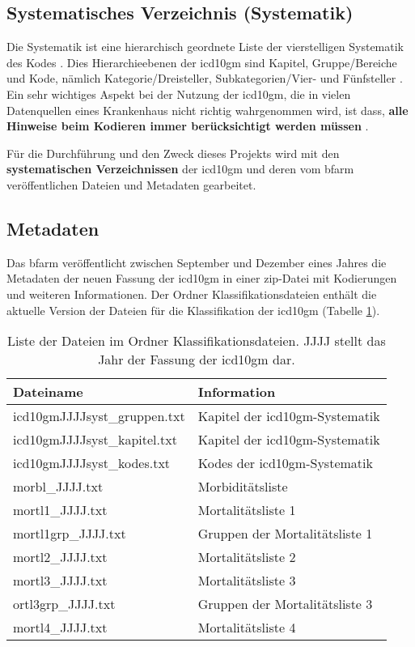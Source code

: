 \subsection{Systematisches Verzeichnis (Systematik)} 

Die Systematik ist eine hierarchisch geordnete Liste der vierstelligen Systematik des Kodes \cite{icd10syst, icd10systauf}. Dies Hierarchieebenen der \ac{icd10gm} sind Kapitel, Gruppe/Bereiche und Kode, nämlich Kategorie/Dreisteller, Subkategorien/Vier- und Fünfsteller \cite{icd10systauf}. Ein sehr wichtiges Aspekt bei der Nutzung der \ac{icd10gm}, die in vielen Datenquellen eines Krankenhaus nicht richtig wahrgenommen wird, ist dass, \textbf{alle Hinweise beim Kodieren immer berücksichtigt werden müssen} \cite{icd10systauf}.

Für die Durchführung und den Zweck dieses Projekts wird mit den \textbf{systematischen Verzeichnissen} der \ac{icd10gm} und deren vom \ac{bfarm} veröffentlichen Dateien und Metadaten gearbeitet. 

\subsection{Metadaten}

Das \ac{bfarm} veröffentlicht zwischen September und Dezember eines Jahres die Metadaten der neuen Fassung der \ac{icd10gm} in einer \ac{zip}-Datei mit Kodierungen und weiteren Informationen. Der Ordner Klassifikationsdateien enthält die aktuelle Version der Dateien für die Klassifikation der \ac{icd10gm} (Tabelle \ref{tab:classfiles}).

\begin{table}[ht]
	\centering
	\small
	\caption[Inhalt im Ordner Klassifikationsdateien ]{Liste der Dateien im Ordner Klassifikationsdateien. \glqq JJJJ\grqq{} stellt das Jahr der Fassung der \ac{icd10gm} dar.}
	\label{tab:classfiles}
	\begin{tabular}{|l|l|}
		\hline
		\rowcolor{lightgray} Dateiname & Information \\
		\hline 
		{\ttfamily icd10gmJJJJsyst\_gruppen.txt} &  Kapitel der \ac{icd10gm}-Systematik \\ \hline
		{\ttfamily icd10gmJJJJsyst\_kapitel.txt} & Kapitel der \ac{icd10gm}-Systematik \\ \hline
		{\ttfamily icd10gmJJJJsyst\_kodes.txt} & Kodes der \ac{icd10gm}-Systematik \\ \hline
		{\ttfamily morbl\_JJJJ.txt} & Morbiditätsliste  \\ \hline
		{\ttfamily mortl1\_JJJJ.txt} & Mortalitätsliste 1 \\ \hline
		{\ttfamily mortl1grp\_JJJJ.txt} & Gruppen der Mortalitätsliste 1 \\ \hline
		{\ttfamily mortl2\_JJJJ.txt} & Mortalitätsliste 2 \\ \hline
		{\ttfamily mortl3\_JJJJ.txt} & Mortalitätsliste 3 \\ \hline
		{\ttfamily ortl3grp\_JJJJ.txt} & Gruppen der Mortalitätsliste 3 \\ \hline
		{\ttfamily mortl4\_JJJJ.txt} & Mortalitätsliste 4 \\ \hline		
	\end{tabular}
\end{table}

